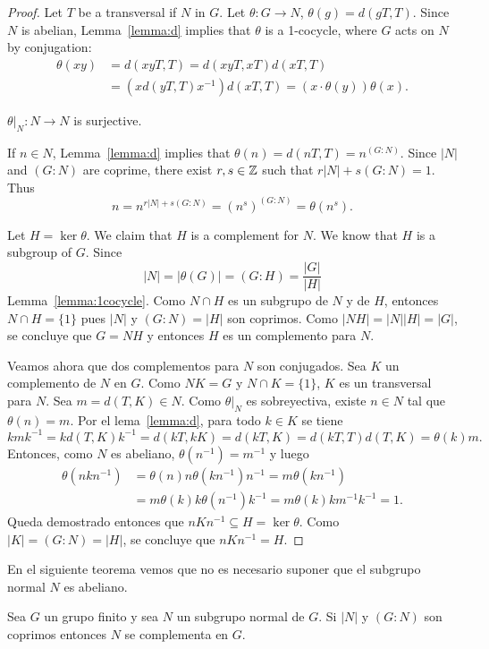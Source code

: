 \begin{proof}
	Let $T$ be a transversal if $N$ in $G$. Let $\theta\colon G\to N$,
	$\theta(g)=d(gT,T)$. Since $N$ is abelian, Lemma~\ref{lemma:d} implies that 
	$\theta$ is a 1-cocycle, where $G$ acts on $N$ by conjugation: 
	\begin{align*}
		\theta(xy)&=d(xyT,T)
		=d(xyT,xT)d(xT,T)\\
		&=(xd(yT,T)x^{-1})d(xT,T)=(x\cdot\theta(y))\theta(x).
	\end{align*}

	\begin{claim}
		$\theta|_N\colon N\to N$ is surjective.
	\end{claim}

	If $n\in N$, Lemma~\ref{lemma:d} implies that 
	$\theta(n)=d(nT,T)=n^{(G:N)}$. Since $|N|$ and $(G:N)$ are coprime, 
	there exist $r,s\in\mathbb{Z}$ such that $r|N|+s(G:N)=1$. Thus
	\[
		n=n^{r|N|+s(G:N)}=(n^s)^{(G:N)}=\theta(n^s).
	\]

	Let $H=\ker\theta$. We claim that $H$ is a complement for $N$. 
	We know that $H$ is a subgroup of $G$. Since 
	\[
		|N|=|\theta(G)|=(G:H)=\frac{|G|}{|H|}
	\]
	Lemma~\ref{lemma:1cocycle}.
	Como $N\cap H$ es un subgrupo de $N$ y de $H$, entonces $N\cap H=\{1\}$ pues
	$|N|$ y $(G:N)=|H|$ son coprimos.  Como $|NH|=|N||H|=|G|$, se concluye que
	$G=NH$ y entonces $H$ es un complemento para $N$.

	Veamos ahora que dos complementos para $N$ son conjugados. 
	Sea $K$ un complemento de $N$ en $G$. Como $NK=G$ y $N\cap K=\{1\}$, $K$ es un
	transversal para $N$. Sea $m=d(T,K)\in N$. Como $\theta|_N$ es
	sobreyectiva, existe $n\in N$ tal que $\theta(n)=m$. Por el
	lema~\ref{lemma:d}, para todo $k\in K$ se tiene
	\[
	kmk^{-1}=kd(T,K)k^{-1}=d(kT,kK)=d(kT,K)=d(kT,T)d(T,K)=\theta(k)m.
	\]
	Entonces, como $N$ es abeliano,
	$\theta(n^{-1})=m^{-1}$ y luego 
	\begin{align*}
		\theta(nkn^{-1})&=\theta(n)n\theta(kn^{-1})n^{-1}
		=m\theta(kn^{-1})\\
		&=m\theta(k)k\theta(n^{-1})k^{-1}
		=m\theta(k)km^{-1}k^{-1}=1.
	\end{align*}
	Queda demostrado entonces que $nKn^{-1}\subseteq H=\ker\theta$. Como
	$|K|=(G:N)=|H|$, se concluye que $nKn^{-1}=H$.
\end{proof}

En el siguiente teorema vemos que no es necesario suponer que el subgrupo
normal $N$ es abeliano.

\begin{theorem}
	\label{thm:SchurZassenhaus}
	Sea $G$ un grupo finito y sea $N$ un subgrupo normal de $G$. Si $|N|$ y
	$(G:N)$ son coprimos entonces $N$ se complementa en $G$.
\end{theorem}

